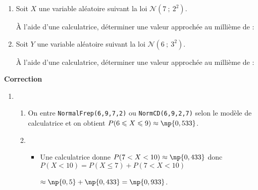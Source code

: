 \documentclass{cornouaille}
\begin{document}
\begin{methode}

\exercice\label{methode5SP2}
\begin{enumerate}
\item Soit $X$ une variable aléatoire suivant la loi $\mathcal{N}(7\ ;\ 2^2)$.


 \`A l'aide d'une calculatrice, déterminer une valeur approchée au millième de :
\item Soit $Y$ une variable aléatoire suivant la loi $\mathcal{N}(6\ ;\ 3^2)$.


 \`A l'aide d'une calculatrice, déterminer une valeur approchée au millième de :
\end{enumerate}
\textbf{Correction}
\begin{enumerate}
\item
\begin{enumerate}
\item On entre \verb"NormalFrep(6,9,7,2)" ou \verb"NormCD(6,9,2,7)"
  selon le modèle de calculatrice et on obtient $P(6\leqslant X\leqslant 9)\approx \np{0,533}$.
\item ~~

\begin{minipage}{0.6\linewidth}
\begin{itemize}
\item Une calculatrice donne $P(7<X<10)\approx \np{0,433}$ donc $P(X<10)=P(X\leqslant 7)+P(7<X<10)$

$\approx \np{0,5}+\np{0,433}=\np{0,933}$.
\end{itemize}
       \end{minipage}
        \hfill
       \begin{minipage}{0.4\linewidth}
        \begin{center}
\end{center}
\end{minipage}
\end{enumerate}
\end{enumerate}
\end{methode}
\end{document}

